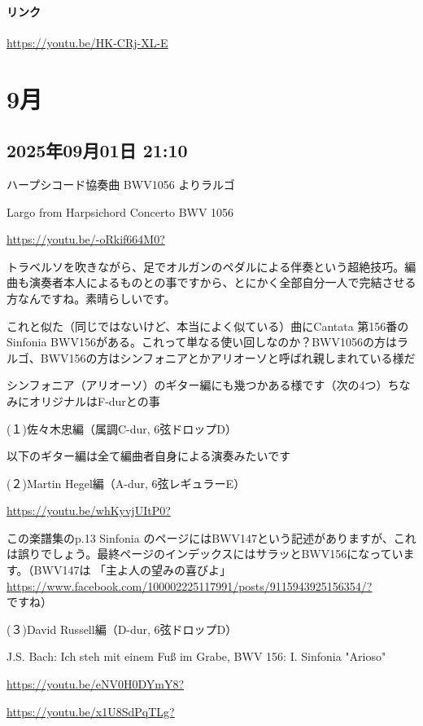 \paragraph{リンク}
\url{https://youtu.be/HK-CRj-XL-E}

\section{9月}

\subsection*{2025年09月01日 21:10}

ハープシコード協奏曲 BWV1056 よりラルゴ

Largo from Harpsichord Concerto BWV 1056

\url{https://youtu.be/-oRkif664M0?}

トラベルソを吹きながら、足でオルガンのペダルによる伴奏という超絶技巧。編曲も演奏者本人によるものとの事ですから、とにかく全部自分一人で完結させる方なんですね。素晴らしいです。

これと似た（同じではないけど、本当によく似ている）曲にCantata 第156番のSinfonia BWV156がある。これって単なる使い回しなのか？BWV1056の方はラルゴ、BWV156の方はシンフォニアとかアリオーソと呼ばれ親しまれている様だ

シンフォニア（アリオーソ）のギター編にも幾つかある様です（次の4つ）ちなみにオリジナルはF-durとの事

(１)佐々木忠編（属調C-dur, 6弦ドロップD）

以下のギター編は全て編曲者自身による演奏みたいです

(２)Martin Hegel編（A-dur, 6弦レギュラーE）

\url{https://youtu.be/whKyvjUItP0?}

この楽譜集のp.13 Sinfonia のページにはBWV147という記述がありますが、これは誤りでしょう。最終ページのインデックスにはサラッとBWV156になっています。（BWV147は 「主よ人の望みの喜びよ」 \url{https://www.facebook.com/100002225117991/posts/9115943925156354/?} ですね）

(３)David Russell編（D-dur, 6弦ドロップD）

J.S. Bach: Ich steh mit einem Fuß im Grabe, BWV 156: I. Sinfonia "Arioso"

\url{https://youtu.be/eNV0H0DYmY8?}

\url{https://youtu.be/x1U8SdPqTLg?}


